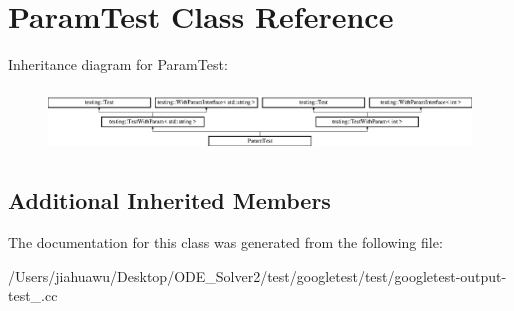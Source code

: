 \hypertarget{class_param_test}{}\section{Param\+Test Class Reference}
\label{class_param_test}
Inheritance diagram for Param\+Test\+:\begin{figure}[H]
\begin{center}
\leavevmode
\includegraphics[height=1.686747cm]{class_param_test}
\end{center}
\end{figure}
\subsection*{Additional Inherited Members}


The documentation for this class was generated from the following file\+:\begin{DoxyCompactItemize}
\item 
/\+Users/jiahuawu/\+Desktop/\+O\+D\+E\+\_\+\+Solver2/test/googletest/test/googletest-\/output-\/test\+\_\+.\+cc\end{DoxyCompactItemize}

